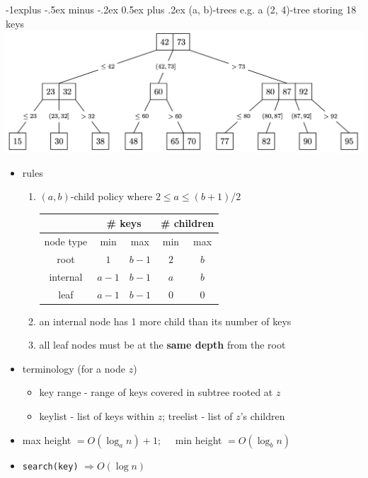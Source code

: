 \documentclass[10pt, landscape]{article}
\makeatletter
\renewcommand{\subsection}{\@startsection{subsection}{2}{0mm}%
                                {-1explus -.5ex minus -.2ex}%
                                {0.5ex plus .2ex}%
                                {\normalfont\normalsize\bfseries}}
\let\Then\Rightarrow
\newcommand{\code}[1]{\textcolor{myblue}{\texttt{#1}}}
\makeatother
\begin{document}
\begin{multicols}{4}
\subsection{(a, b)-trees}
{\scriptsize{e.g. a (2, 4)-tree storing 18 keys}}
\includegraphics[width=0.8\linewidth]{cs2040s-ab-tree.png}
\begin{itemize}
    \item rules
    \begin{enumerate}
        \item $(a, b)$-child policy where $2 \leq a \leq (b+1)/2$
        \begin{tabular}{|c|c|c|c|c|}
            \hline 
             & \multicolumn{2}{c|}{\# keys} & \multicolumn{2}{c|}{\# children}
            \\\hline
            node type & min & max & min & max
            \\\hline
            root & $1$ & $b-1$ & $2$ & $b$
            \\\hline
            internal & $a-1$ & $b-1$ & $a$ & $b$
            \\\hline
            leaf & $a-1$ & $b-1$ & $0$ & $0$
            \\\hline
        \end{tabular}
        \item an internal node has 1 more child than its number of keys
        \item all leaf nodes must be at the \textbf{same depth} from the root
    \end{enumerate}
    \item terminology (for a node $z$)
    \begin{itemize}
        \item key range - range of keys covered in subtree rooted at $z$
        \item keylist - list of keys within $z$; treelist - list of $z$'s children
    \end{itemize}
    \item max height $= O(\log_an) + 1;\quad$ min height $= O(\log_bn)$
    \item \code{search(key)} $\Then O(\log n)$

\end{itemize}
\end{multicols}
\end{document}
